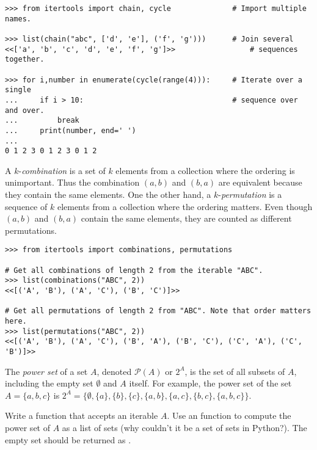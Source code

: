 \begin{lstlisting}
>>> from itertools import chain, cycle              # Import multiple names.

>>> list(chain("abc", ['d', 'e'], ('f', 'g')))      # Join several
<<['a', 'b', 'c', 'd', 'e', 'f', 'g']>>                 # sequences together.

>>> for i,number in enumerate(cycle(range(4))):     # Iterate over a single
...     if i > 10:                                  # sequence over and over.
...         break
...     print(number, end=' ')
...
0 1 2 3 0 1 2 3 0 1 2
\end{lstlisting}

A $k$-\emph{combination} is a set of $k$ elements from a collection where the ordering is unimportant.
Thus the combination $(a,b)$ and $(b,a)$ are equivalent because they contain the same elements.
One the other hand, a $k$-\emph{permutation} is a sequence of $k$ elements from a collection where the ordering matters.
Even though $(a,b)$ and $(b,a)$ contain the same elements, they are counted as different permutations.

\begin{lstlisting}
>>> from itertools import combinations, permutations

# Get all combinations of length 2 from the iterable "ABC".
>>> list(combinations("ABC", 2))
<<[('A', 'B'), ('A', 'C'), ('B', 'C')]>>

# Get all permutations of length 2 from "ABC". Note that order matters here.
>>> list(permutations("ABC", 2))
<<[('A', 'B'), ('A', 'C'), ('B', 'A'), ('B', 'C'), ('C', 'A'), ('C', 'B')]>>
\end{lstlisting}

\begin{problem}
The \emph{power set} of a set $A$, denoted $\mathcal{P}(A)$ or $2^A$, is the set of all subsets of $A$, including the empty set $\emptyset$ and $A$ itself.
For example, the power set of the set $A = \{a, b, c\}$ is $2^A = \{\emptyset, \{a\}, \{b\}, \{c\}, \{a,b\}, \{a,c\}, \{b,c\}, \{a,b,c\}\}$.

Write a function that accepts an iterable $A$.
Use an  function to compute the power set of $A$ as a list of sets (why couldn't it be a set of sets in Python?).
The empty set should be returned as .
\end{problem}

